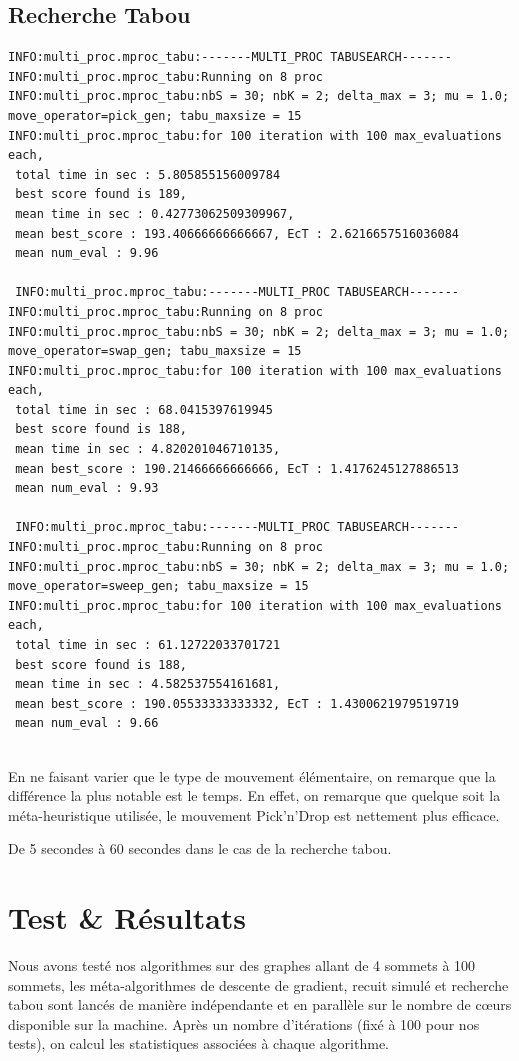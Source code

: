 \documentclass[a4paper]{article}
\begin{document}
	\subsection{Recherche Tabou}
		\begin{verbatim}
INFO:multi_proc.mproc_tabu:-------MULTI_PROC TABUSEARCH-------
INFO:multi_proc.mproc_tabu:Running on 8 proc
INFO:multi_proc.mproc_tabu:nbS = 30; nbK = 2; delta_max = 3; mu = 1.0;
move_operator=pick_gen; tabu_maxsize = 15
INFO:multi_proc.mproc_tabu:for 100 iteration with 100 max_evaluations each, 
 total time in sec : 5.805855156009784
 best score found is 189,
 mean time in sec : 0.42773062509309967,
 mean best_score : 193.40666666666667, EcT : 2.6216657516036084
 mean num_eval : 9.96

 INFO:multi_proc.mproc_tabu:-------MULTI_PROC TABUSEARCH-------
INFO:multi_proc.mproc_tabu:Running on 8 proc
INFO:multi_proc.mproc_tabu:nbS = 30; nbK = 2; delta_max = 3; mu = 1.0;
move_operator=swap_gen; tabu_maxsize = 15
INFO:multi_proc.mproc_tabu:for 100 iteration with 100 max_evaluations each, 
 total time in sec : 68.0415397619945
 best score found is 188,
 mean time in sec : 4.820201046710135,
 mean best_score : 190.21466666666666, EcT : 1.4176245127886513
 mean num_eval : 9.93

 INFO:multi_proc.mproc_tabu:-------MULTI_PROC TABUSEARCH-------
INFO:multi_proc.mproc_tabu:Running on 8 proc
INFO:multi_proc.mproc_tabu:nbS = 30; nbK = 2; delta_max = 3; mu = 1.0;
move_operator=sweep_gen; tabu_maxsize = 15
INFO:multi_proc.mproc_tabu:for 100 iteration with 100 max_evaluations each, 
 total time in sec : 61.12722033701721
 best score found is 188,
 mean time in sec : 4.582537554161681,
 mean best_score : 190.05533333333332, EcT : 1.4300621979519719
 mean num_eval : 9.66
		\end{verbatim}
\\

En ne faisant varier que le type de mouvement élémentaire, on remarque que la différence la plus notable est le temps. En effet, on remarque que quelque soit la méta-heuristique utilisée, le mouvement Pick'n'Drop est nettement plus efficace. 

De 5 secondes à 60 secondes dans le cas de la recherche tabou.
\section{Test \& Résultats}
Nous avons testé nos algorithmes sur des graphes allant de 4 sommets à 100 sommets, les méta-algorithmes de descente de gradient, recuit simulé et recherche tabou sont lancés de manière indépendante et en parallèle sur le nombre de cœurs disponible sur la machine. Après un nombre d'itérations (fixé à 100 pour nos tests), on calcul les statistiques associées à chaque algorithme.
\end{document}
